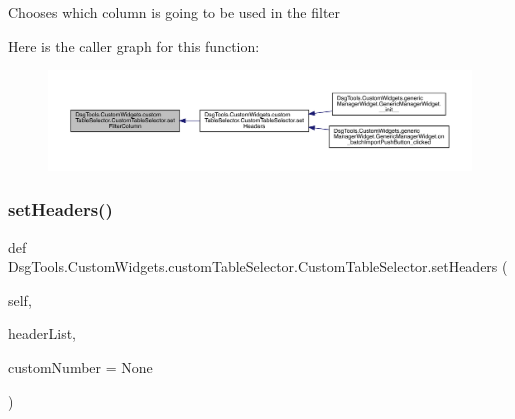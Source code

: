 \begin{DoxyVerb}Chooses which column is going to be used in the filter
\end{DoxyVerb}
 Here is the caller graph for this function\+:
\nopagebreak
\begin{figure}[H]
\begin{center}
\leavevmode
\includegraphics[width=350pt]{class_dsg_tools_1_1_custom_widgets_1_1custom_table_selector_1_1_custom_table_selector_acbfc7c0f716159e87006ce9c7fda6586_icgraph}
\end{center}
\end{figure}
\mbox{\label{class_dsg_tools_1_1_custom_widgets_1_1custom_table_selector_1_1_custom_table_selector_a5dafcf0c8a8e0ec2a15f4a454e0e4602}} 
\subsubsection{\texorpdfstring{set\+Headers()}{setHeaders()}}
{\footnotesize\ttfamily def Dsg\+Tools.\+Custom\+Widgets.\+custom\+Table\+Selector.\+Custom\+Table\+Selector.\+set\+Headers (\begin{DoxyParamCaption}\item[{}]{self,  }\item[{}]{header\+List,  }\item[{}]{custom\+Number = {\ttfamily None} }\end{DoxyParamCaption})}

